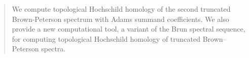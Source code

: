 \begin{abstract}
We compute topological Hochschild homology of the second truncated Brown-Peterson spectrum with Adams summand coefficients. We also provide a new computational tool, a variant of the Brun spectral sequence, for computing topological Hochschild homology of truncated Brown--Peterson spectra.
\end{abstract}